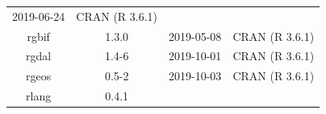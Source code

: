 \documentclass[11pt,]{book}
\begin{document}
\begin{longtable}[]{@{}cccc@{}}
\begin{minipage}[t]{0.16\columnwidth}
2019-06-24\strut
\end{minipage} & \begin{minipage}[t]{0.36\columnwidth}\centering\strut
CRAN (R 3.6.1)\strut
\end{minipage}\tabularnewline
\begin{minipage}[t]{0.18\columnwidth}\centering\strut
rgbif\strut
\end{minipage} & \begin{minipage}[t]{0.19\columnwidth}\centering\strut
1.3.0\strut
\end{minipage} & \begin{minipage}[t]{0.16\columnwidth}\centering\strut
2019-05-08\strut
\end{minipage} & \begin{minipage}[t]{0.36\columnwidth}\centering\strut
CRAN (R 3.6.1)\strut
\end{minipage}\tabularnewline
\begin{minipage}[t]{0.18\columnwidth}\centering\strut
rgdal\strut
\end{minipage} & \begin{minipage}[t]{0.19\columnwidth}\centering\strut
1.4-6\strut
\end{minipage} & \begin{minipage}[t]{0.16\columnwidth}\centering\strut
2019-10-01\strut
\end{minipage} & \begin{minipage}[t]{0.36\columnwidth}\centering\strut
CRAN (R 3.6.1)\strut
\end{minipage}\tabularnewline
\begin{minipage}[t]{0.18\columnwidth}\centering\strut
rgeos\strut
\end{minipage} & \begin{minipage}[t]{0.19\columnwidth}\centering\strut
0.5-2\strut
\end{minipage} & \begin{minipage}[t]{0.16\columnwidth}\centering\strut
2019-10-03\strut
\end{minipage} & \begin{minipage}[t]{0.36\columnwidth}\centering\strut
CRAN (R 3.6.1)\strut
\end{minipage}\tabularnewline
\begin{minipage}[t]{0.18\columnwidth}\centering\strut
rlang\strut
\end{minipage} & \begin{minipage}[t]{0.19\columnwidth}\centering\strut
0.4.1\strut
\end{minipage} & \begin{minipage}[t]{0.16\columnwidth}\centering\strut

\end{minipage}
\end{longtable}
\end{document}
